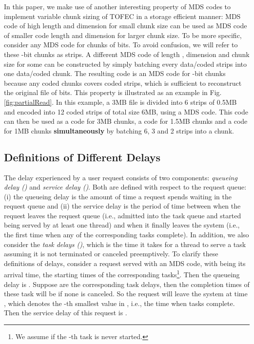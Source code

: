 \documentclass[journal]{IEEEtran}
\newcommand{\ourproposal}{TOFEC\xspace}
\begin{document}
In this paper, we make use of another interesting property of MDS codes to implement variable chunk sizing of \ourproposal in a storage efficient manner:  MDS code of high length and dimension for small chunk size can be used as MDS code of smaller code length and dimension for larger chunk size. To be more specific, consider any  MDS code for chunks of  bits. To avoid confusion, we will refer to these -bit chunks as strips. A different MDS code of length , dimension  and chunk size  for some  can be constructed by simply batching every  data/coded strips into one data/coded chunk. The resulting code is an  MDS code for -bit chunks because any  coded chunks covers  coded strips, which is sufficient to reconstruct the original file of  bits.  This property is illustrated as an example in Fig. \ref{fig:partialRead}. In this example, a 3MB file is divided into 6 strips of 0.5MB and encoded into 12 coded strips of total size 6MB, using a  MDS code. This code can then be used as a  code for 3MB chunks, a  code for 1.5MB chunks and a  code for 1MB chunks {\bf simultaneously} by batching 6, 3 and 2 strips into a chunk. 



\subsection{Definitions of Different Delays}
The delay experienced by a user request consists of two components: {\em queueing delay ()} and {\em service delay ()}. Both are defined with respect to the request queue: (i) the queueing delay is the amount of time a request spends waiting in the request queue and (ii) the service delay is the period of time between when the request leaves the request queue (i.e., admitted into the task queue and started being served by at least one thread) and when it finally leaves the system (i.e., the first time when any  of the corresponding tasks complete). In addition, we also consider the {\em task delays ()}, which is the time it takes for a thread to serve a task assuming it is not terminated or canceled preemptively. To clarify these definitions of delays, consider a request served with an  MDS code, with  being its arrival time,  the starting times of the corresponding  tasks\footnote{We assume  if the -th task is never started.}. Then the queueing delay is . Suppose  are the corresponding task delays, then the completion times of these task will be  if none is canceled. So the request will leave the system at time , which denotes the -th smallest value in , i.e., the time when  tasks complete. Then the service delay of this request is .
\end{document}
